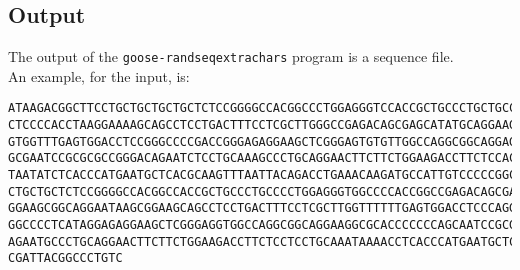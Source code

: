 \subsection*{Output}
The output of the \texttt{goose-randseqextrachars} program is a sequence file.\\
An example, for the input, is:
\begin{lstlisting}
ATAAGACGGCTTCCTGCTGCTGCTGCTCTCCGGGGCCACGGCCCTGGAGGGTCCACCGCTGCCCTGCTGCCATTGTCCCC
CTCCCCACCTAAGGAAAAGCAGCCTCCTGACTTTCCTCGCTTGGGCCGAGACAGCGAGCATATGCAGGAAGCGGCAGGAA
GTGGTTTGAGTGGACCTCCGGGCCCCGACCGGGAGAGGAAGCTCGGGAGTGTGTTGGCCAGGCGGCAGGAGACCAGTGCC
GCGAATCCGCGCGCCGGGACAGAATCTCCTGCAAAGCCCTGCAGGAACTTCTTCTGGAAGACCTTCTCCACCCCCCCAGC
TAATATCTCACCCATGAATGCTCACGCAAGTTTAATTACAGACCTGAAACAAGATGCCATTGTCCCCCGGCCTCCTGCTG
CTGCTGCTCTCCGGGGCCACGGCCACCGCTGCCCTGCCCCTGGAGGGTGGCCCCACCGGCCGAGACAGCGAGCATATGCA
GGAAGCGGCAGGAATAAGCGGAAGCAGCCTCCTGACTTTCCTCGCTTGGTTTTTTGAGTGGACCTCCCAGGCCAGTGCCG
GGCCCCTCATAGGAGAGGAAGCTCGGGAGGTGGCCAGGCGGCAGGAAGGCGCACCCCCCCAGCAATCCGCGCGCCGGGAC
AGAATGCCCTGCAGGAACTTCTTCTGGAAGACCTTCTCCTCCTGCAAATAAAACCTCACCCATGAATGCTCACGCAAGTT
CGATTACGGCCCTGTC
\end{lstlisting}